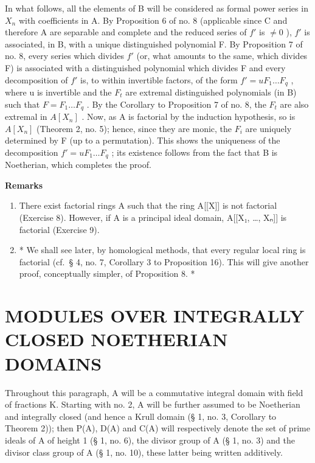 In what follows, all the elements of B will be considered as formal power series in \(X_{n}\) with coefficients in A. By Proposition 6 of no. 8 (applicable since C and therefore A are separable and complete and the reduced series of \(f'\) is \(\neq0\) ), \(f'\) is associated, in B, with a unique distinguished polynomial F. By Proposition 7 of no. 8, every series which divides \(f'\) (or, what amounts to the same, which divides F) is associated with a distinguished polynomial which divides F and every decomposition of \(f'\) is, to within invertible factors, of the form \(f' = uF_{1}\ldots F_{q}\) , where u is invertible and the \(F_{t}\) are extremal distinguished polynomials (in B) such that \(F = F_{1}\ldots F_{q}\) . By the Corollary to Proposition 7 of no. 8, the \(F_{t}\) are also extremal in \(A[X_{n}]\) . Now, as A is factorial by the induction hypothesis, so is \(A[X_{n}]\) (Theorem 2, no. 5); hence, since they are monic, the \(F_{i}\) are uniquely determined by F (up to a permutation). This shows the uniqueness of the decomposition \(f' = uF_{1} \ldots F_{q}\) ; its existence follows from the fact that B is Noetherian, which completes the proof.

\textbf{Remarks}\par

\begin{enumerate}
\def\labelenumi{(\arabic{enumi})}
\item
  There exist factorial rings A such that the ring A{[}{[}X{]}{]} is not factorial (Exercise 8). However, if A is a principal ideal domain, A{[}{[}X₁, \ldots, Xₙ{]}{]} is factorial (Exercise 9).
\item
  * We shall see later, by homological methods, that every regular local ring is factorial (cf.~§ 4, no. 7, Corollary 3 to Proposition 16). This will give another proof, conceptually simpler, of Proposition 8. *
\end{enumerate}

\section{MODULES OVER INTEGRALLY CLOSED NOETHERIAN DOMAINS}

Throughout this paragraph, A will be a commutative integral domain with field of fractions K. Starting with no. 2, A will be further assumed to be Noetherian and integrally closed (and hence a Krull domain (§ 1, no. 3, Corollary to Theorem 2)); then P(A), D(A) and C(A) will respectively denote the set of prime ideals of A of height 1 (§ 1, no. 6), the divisor group of A (§ 1, no. 3) and the divisor class group of A (§ 1, no. 10), these latter being written additively.

